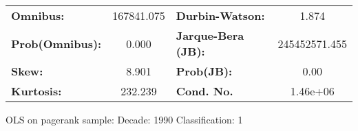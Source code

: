 \begin{center}
\begin{tabular}{lccccc}
\bottomrule
\end{tabular}
\begin{tabular}{lclc}
\textbf{Omnibus:}       & 167841.075 & \textbf{  Durbin-Watson:     } &       1.874    \\
\textbf{Prob(Omnibus):} &    0.000   & \textbf{  Jarque-Bera (JB):  } & 245452571.455  \\
\textbf{Skew:}          &    8.901   & \textbf{  Prob(JB):          } &        0.00    \\
\textbf{Kurtosis:}      &  232.239   & \textbf{  Cond. No.          } &    1.46e+06    \\
\bottomrule
\end{tabular}
\end{center}
\break
OLS on pagerank sample: Decade: 1990 Classification: 1
